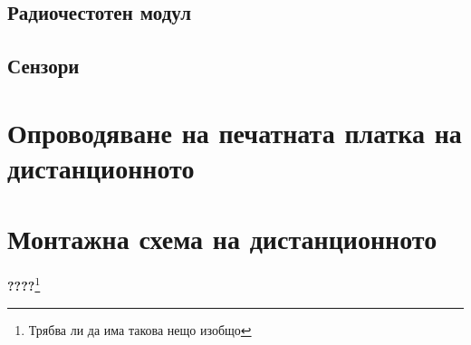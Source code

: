 \subsection{Радиочестотен модул}

\subsection{Сензори}


\section{Опроводяване на печатната платка на дистанционното}


\section{Монтажна схема на дистанционното}

\textbf{????}\footnote{Трябва ли да има такова нещо изобщо}